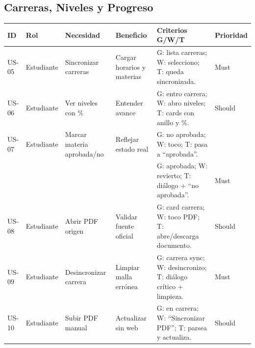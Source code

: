 \subsection{Carreras, Niveles y Progreso}
\small
\captionsetup{type=table}
\label{tab:hu_carreras}
\begin{tabularx}{\linewidth}{@{}P{1.15cm}P{2.3cm}XP{2.3cm}XP{1.2cm}@{}}
\toprule
ID & Rol & Necesidad & Beneficio & Criterios G/W/T & Prioridad \\
\midrule
US-05 & Estudiante & Sincronizar carreras & Cargar horarios y materias & G: lista carreras; W: selecciono; T: queda sincronizada. & Must \\
US-06 & Estudiante & Ver niveles con \% & Entender avance & G: entro carrera; W: abro niveles; T: cards con anillo y \%. & Should \\
US-07 & Estudiante & Marcar materia aprobada/no & Reflejar estado real & G: no aprobada; W: toco; T: pasa a ``aprobada''.\\[-0.4em]
 & & & & G: aprobada; W: revierto; T: diálogo + ``no aprobada''. & Must \\
US-08 & Estudiante & Abrir PDF origen & Validar fuente oficial & G: card carrera; W: toco PDF; T: abre/descarga documento. & Should \\
US-09 & Estudiante & Desincronizar carrera & Limpiar malla errónea & G: carrera sync; W: desincronizo; T: diálogo crítico + limpieza. & Must \\
US-10 & Estudiante & Subir PDF manual & Actualizar sin web & G: en carrera; W: ``Sincronizar PDF''; T: parsea y actualiza. & Should \\
\bottomrule
\end{tabularx}
\normalsize

\medskip

